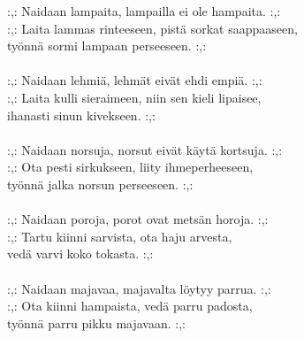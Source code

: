 
            :,: Naidaan lampaita, lampailla ei ole hampaita. :,: \\
            :,: Laita lammas rinteeseen, pistä sorkat saappaaseen, \\
            työnnä sormi lampaan perseeseen. :,: \\
\hspace{10mm} \\
            :,: Naidaan lehmiä, lehmät eivät ehdi empiä. :,: \\
            :,: Laita kulli sieraimeen, niin sen kieli lipaisee, \\
            ihanasti sinun kivekseen. :,: \\
\hspace{10mm} \\
            :,: Naidaan norsuja, norsut eivät käytä kortsuja. :,: \\
            :,: Ota pesti sirkukseen, liity ihmeperheeseen, \\
            työnnä jalka norsun perseeseen. :,: \\
\hspace{10mm} \\
            :,: Naidaan poroja, porot ovat metsän horoja. :,: \\
            :,: Tartu kiinni sarvista, ota haju arvesta, \\
            vedä varvi koko tokasta. :,: \\
\hspace{10mm} \\
            :,: Naidaan majavaa, majavalta löytyy parrua. :,: \\
            :,: Ota kiinni hampaista, vedä parru padosta, \\
            työnnä parru pikku majavaan. :,: \\
\hspace{10mm} \\
